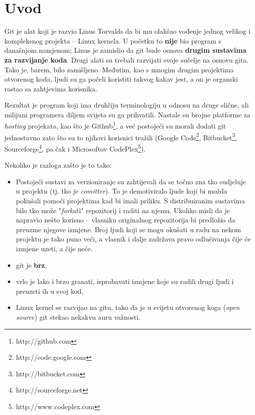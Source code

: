 \chapter*{Uvod}

Git je alat koji je razvio Linus Torvalds da bi mu olakšao vođenje jednog velikog i kompleksnog projekta -- Linux kernela.
U početku to \textbf{nije} bio program s današnjom namjenom; Linus je zamislio da git bude osnova \textbf{drugim sustavima za razvijanje koda}.
Drugi alati su trebali razvijati svoje sučelje na osnovu gita.
Tako je, barem, bilo zamišljeno.
Međutim, kao s mnogim drugim projektima otvorenog koda, ljudi su ga počeli koristiti takvog kakav jest, a on je organski rastao sa zahtjevima korisnika.

Rezultat je program koji ima drukčiju terminologiju u odnosu na druge slične, ali milijuni programera diljem svijeta su ga prihvatili. 
Nastale su brojne platforme za \emph{hosting} projekata, kao što je Github\footnote{http://github.com}, a već postojeći su morali dodati git jednostavno zato što su to njihovi korisnici tražili (Google Code\footnote{http://code.google.com}, Bitbucket\footnote{http://bitbucket.com}, Sourceforge\footnote{http://sourceforge.net}, pa čak i Microsoftov CodePlex\footnote{http://www.codeplex.com}).

Nekoliko je razloga zašto je to tako:

\begin{itemize}
	\item Postojeći sustavi za verzioniranje su zahtijevali da se točno zna tko sudjeluje u projektu (tj. tko je \emph{comitter}). %
    To je demotiviralo ljude koji bi možda pokušali pomoći projektima kad bi imali priliku. %
    S distribuiranim sustavima bilo tko može "\emph{fork}ati" repozitorij i raditi na njemu. %
    Ukoliko misli da je napravio nešto korisno -- vlasniku originalnog repozitorija bi predložio da preuzme njegove izmjene. %
    Broj ljudi koji se mogu okušati u radu na nekom projektu je tako puno veći, a vlasnik i dalje zadržava pravo odlučivanja čije će izmjene uzeti, a čije neće.
	\item git je \textbf{brz},
	\item vrlo je lako i brzo granati, isprobavati izmjene koje su radili drugi ljudi i preuzeti ih u svoj kod,
	\item Linux kernel se razvijao na gitu, tako da je u svijetu otvorenog koga (\emph{open source}) git stekao nekakvu auru važnosti.
\end{itemize}

